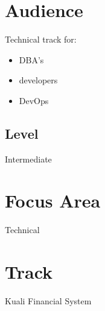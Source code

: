 \documentclass[12pt,notitlepage]{article}
\begin{document}
\section{Audience}
Technical track for: 
\begin{itemize}
\item DBA’s
\item developers
\item DevOps
\end{itemize}

\subsection{Level}
Intermediate

\section{Focus Area}
Technical

\section{Track}
Kuali Financial System
\end{document}
